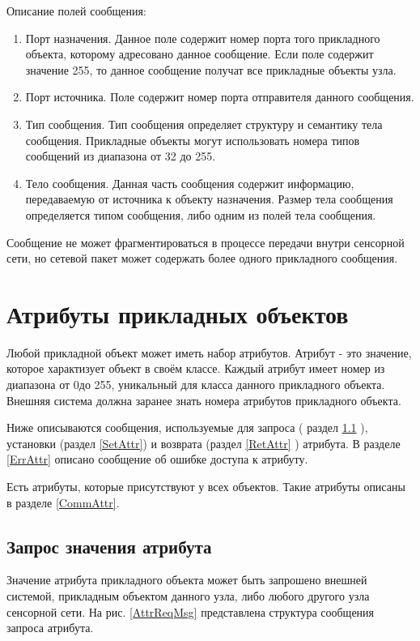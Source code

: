 Описание полей сообщения:
\begin{enumerate}
\item Порт назначения. Данное поле содержит номер порта того прикладного объекта, которому
адресовано данное сообщение. Если поле содержит значение 255, то данное сообщение получат все
прикладные объекты узла.
\item Порт источника. Поле содержит номер порта отправителя данного сообщения.
\item Тип сообщения. Тип сообщения определяет структуру и семантику тела сообщения. Прикладные 
объекты могут использовать номера типов сообщений из диапазона от 32 до 255.
\item Тело сообщения. Данная часть сообщения содержит информацию, передаваемую от источника к
объекту назначения. Размер тела сообщения определяется типом сообщения, либо одним из полей
тела сообщения.
\end{enumerate}

Сообщение не может фрагментироваться в процессе передачи внутри сенсорной сети, но сетевой
пакет может содержать более одного прикладного сообщения.

\section{Атрибуты прикладных объектов}

    Любой прикладной объект может иметь набор атрибутов. Атрибут - это значение, которое характизует объект
в своём классе. Каждый атрибут имеет номер из диапазона от 0до 255, уникальный для класса данного прикладного объекта. 
Внешняя система должна заранее знать номера атрибутов прикладного объекта.

    Ниже описываются сообщения, используемые для запроса ( раздел \ref{ReqAttr} ), установки (раздел \ref{SetAttr})
и возврата (раздел \ref{RetAttr} ) атрибута. В разделе \ref{ErrAttr} описано сообщение об ошибке доступа к атрибуту.

    Есть атрибуты, которые присутствуют у всех объектов. Такие атрибуты описаны в разделе \ref{CommAttr}.

\subsection{Запрос значения атрибута}
\label{ReqAttr}
    Значение атрибута прикладного объекта может быть запрошено внешней системой, прикладным объектом
данного узла, либо любого другого узла сенсорной сети. На рис. \ref{AttrReqMsg} представлена структура
сообщения запроса атрибута.

